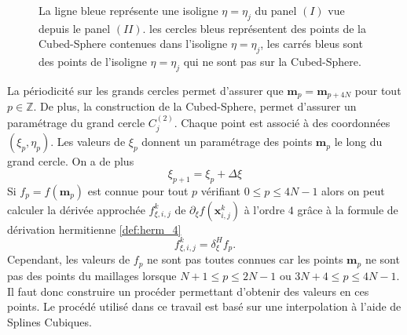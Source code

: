 \begin{figure}[htbp]
\begin{center}
\end{center}
\caption{La ligne bleue représente une isoligne $\eta=\eta_j$ du panel $(I)$ vue depuis le panel $(II)$. les cercles bleus représentent des points de la Cubed-Sphere contenues dans l'isoligne $\eta=\eta_j$, les carrés bleus sont des points de l'isoligne $\eta=\eta_j$ qui ne sont pas sur la Cubed-Sphere.}
\label{fig: panel II_interp}
\end{figure}  

La périodicité sur les grands cercles permet d'assurer que $\mathbf{m}_p = \mathbf{m}_{p+4N}$ pour tout $p \in \mathbb{Z}$. De plus, la construction de la Cubed-Sphere, permet d'assurer un paramétrage du grand cercle $C^{(2)}_j$. Chaque point est associé à des coordonnées $(\xi_p, \eta_p)$. Les valeurs de $\xi_p$ donnent un paramétrage des points $\mathbf{m}_p$ le long du grand cercle. On a de plus
\begin{equation}
\xi_{p+1} = \xi_p + \Delta \xi
\end{equation}
Si $f_p = f(\mathbf{m}_p)$ est connue pour tout $p$ vérifiant $0 \leq p \leq 4N-1$ alors on peut calculer la dérivée approchée $f_{\xi,i,j}^k$ de $\partial_{\xi}f(\mathbf{x}_{i,j}^k)$ à l'ordre $4$ grâce à la formule de dérivation hermitienne \eqref{def:herm_4}
\begin{equation}
f_{\xi,i,j}^k = \delta_{\xi}^H f_p.
\end{equation}
Cependant, les valeurs de $f_p$ ne sont pas toutes connues car les points $\mathbf{m}_p$ ne sont pas des points du maillages lorsque $N+1 \leq p \leq 2N-1$ ou $3N+4 \leq p \leq 4N-1$. Il faut donc construire un procéder permettant d'obtenir des valeurs en ces points. Le procédé utilisé dans ce travail est basé sur une interpolation à l'aide de Splines Cubiques.

